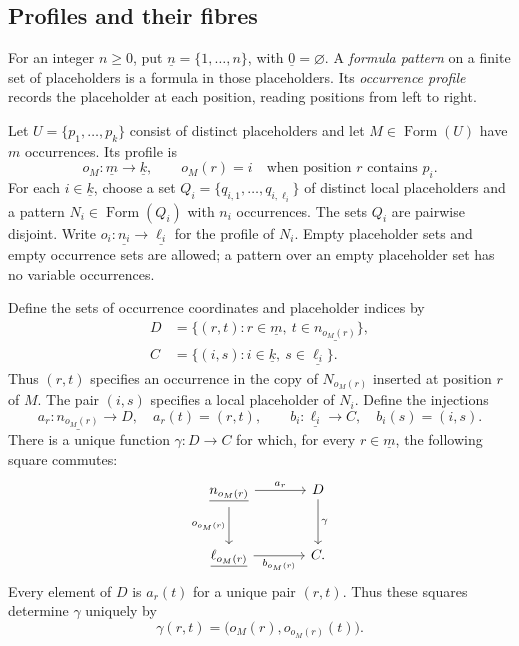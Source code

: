 \documentclass[11pt]{article}
\newcommand{\FormulaSet}{\operatorname{Form}}
\begin{document}
\subsection{Profiles and their fibres}\label{app:profiles}

For an integer $n\geq0$, put $\underline n=\{1,\ldots,n\}$, with
$\underline0=\varnothing$. A \emph{formula pattern} on a finite set
of placeholders is a formula in those placeholders. Its
\emph{occurrence profile} records the placeholder at each position,
reading positions from left to right.

Let $U=\{p_1,\ldots,p_k\}$ consist of distinct placeholders and let
$M\in\FormulaSet(U)$ have $m$ occurrences. Its profile is
\[
 o_M:\underline m\longrightarrow\underline k,
 \qquad o_M(r)=i\quad\text{when position $r$ contains $p_i$}.
\]
For each $i\in\underline k$, choose a set
$Q_i=\{q_{i,1},\ldots,q_{i,\ell_i}\}$ of distinct local placeholders and a
pattern $N_i\in\FormulaSet(Q_i)$ with $n_i$ occurrences. The sets
$Q_i$ are pairwise disjoint. Write
$o_i:\underline{n_i}\to\underline{\ell_i}$ for the profile of $N_i$.
Empty placeholder sets and empty occurrence sets are allowed; a
pattern over an empty placeholder set has no variable occurrences.

Define the sets of occurrence coordinates and placeholder indices by
\[
 \begin{aligned}
 D&=\{(r,t):r\in\underline m,\ t\in\underline{n_{o_M(r)}}\},\\
 C&=\{(i,s):i\in\underline k,\ s\in\underline{\ell_i}\}.
 \end{aligned}
\]
Thus $(r,t)$ specifies an occurrence in the copy of $N_{o_M(r)}$
inserted at position $r$ of $M$. The pair $(i,s)$ specifies a local
placeholder of $N_i$. Define the injections
\[
 a_r:\underline{n_{o_M(r)}}\longrightarrow D,\quad a_r(t)=(r,t),
 \qquad
 b_i:\underline{\ell_i}\longrightarrow C,\quad b_i(s)=(i,s).
\]
There is a unique function $\gamma:D\to C$ for which, for every
$r\in\underline m$, the following square commutes:
\begin{equation}\label{eq:app-fibre}
\begin{tikzcd}[column sep=large,row sep=large]
 \underline{n_{o_M(r)}}\arrow[r,"a_r"]\arrow[d,"o_{o_M(r)}"']
   &D\arrow[d,"\gamma"]\\
 \underline{\ell_{o_M(r)}}\arrow[r,"b_{o_M(r)}"']&C.
\end{tikzcd}
\end{equation}
Every element of $D$ is $a_r(t)$ for a unique pair $(r,t)$.
Thus these squares determine $\gamma$ uniquely by
\[
 \gamma(r,t)=\bigl(o_M(r),o_{o_M(r)}(t)\bigr).
\]
\end{document}
